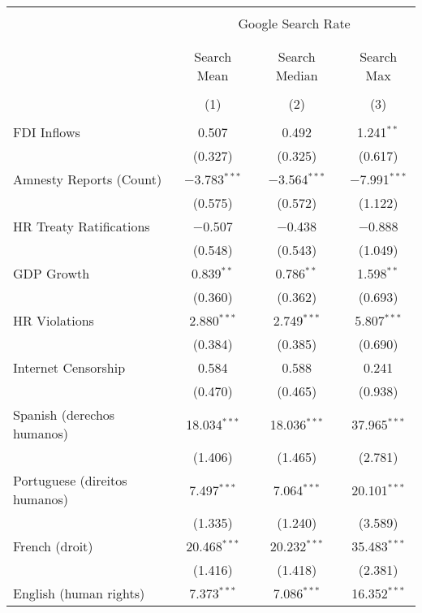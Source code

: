 
\begin{table}[!htbp] \centering 
  \caption{} 
  \label{} 
\begin{tabular}{@{\extracolsep{5pt}}lccc} 
\\[-1.8ex]\hline 
\hline \\[-1.8ex] 
 & \multicolumn{3}{c}{Google Search Rate} \\ 
\cline{2-4} 
\\[-1.8ex] & \multicolumn{3}{c}{ } \\ 
 & Search Mean & Search Median & Search Max \\ 
\\[-1.8ex] & (1) & (2) & (3)\\ 
\hline \\[-1.8ex] 
 FDI Inflows & 0.507 & 0.492 & 1.241$^{**}$ \\ 
  & (0.327) & (0.325) & (0.617) \\ 
  Amnesty Reports (Count) & $-$3.783$^{***}$ & $-$3.564$^{***}$ & $-$7.991$^{***}$ \\ 
  & (0.575) & (0.572) & (1.122) \\ 
  HR Treaty Ratifications & $-$0.507 & $-$0.438 & $-$0.888 \\ 
  & (0.548) & (0.543) & (1.049) \\ 
  GDP Growth & 0.839$^{**}$ & 0.786$^{**}$ & 1.598$^{**}$ \\ 
  & (0.360) & (0.362) & (0.693) \\ 
  HR Violations & 2.880$^{***}$ & 2.749$^{***}$ & 5.807$^{***}$ \\ 
  & (0.384) & (0.385) & (0.690) \\ 
  Internet Censorship & 0.584 & 0.588 & 0.241 \\ 
  & (0.470) & (0.465) & (0.938) \\ 
  Spanish (derechos humanos) & 18.034$^{***}$ & 18.036$^{***}$ & 37.965$^{***}$ \\ 
  & (1.406) & (1.465) & (2.781) \\ 
  Portuguese (direitos humanos) & 7.497$^{***}$ & 7.064$^{***}$ & 20.101$^{***}$ \\ 
  & (1.335) & (1.240) & (3.589) \\ 
  French (droit) & 20.468$^{***}$ & 20.232$^{***}$ & 35.483$^{***}$ \\ 
  & (1.416) & (1.418) & (2.381) \\ 
  English (human rights) & 7.373$^{***}$ & 7.086$^{***}$ & 16.352$^{***}$ \\ 

\end{tabular}
\end{table}
